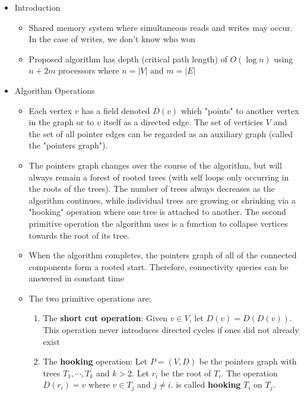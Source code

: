 \documentclass[a4paper]{article}
\begin{document}
\begin{itemize}
\item Introduction
\begin{itemize}
\item Shared memory system where simultaneous reads and writes may occur. In the case of writes, we don't know who won

\item Proposed algorithm has depth (critical path length) of $O(\log n)$ using $n + 2m$ processors where $n = |V|$ and $m = |E|$
\end{itemize}

\item Algorithm Operations
\begin{itemize}
\item Each vertex $v$ has a field denoted $D(v)$ which "points" to another vertex in the graph or to $v$ itself as a directed edge. The set of verticies $V$ and the set of all pointer edges can be regarded as an auxiliary graph (called the "pointers graph"). 

\item The pointers graph changes over the course of the algorithm, but will always remain a forest of rooted trees (with self loops only occurring in the roots of the trees). The number of trees always decreases as the algorithm continues, while individual trees are growing or shrinking via a "hooking" operation where one tree is attached to another. The second primitive operation the algorithm uses is a function to collapse vertices towards the root of its tree.

\item When the algorithm completes, the pointers graph of all of the connected components form a rooted start. Therefore, connectivity queries can be answered in constant time

\item The two primitive operations are:
\begin{enumerate}
\item The \textbf{short cut operation}: Given $v \in V$, let $D(v) = D(D(v))$. This operation never introduces directed cycles if ones did not already exist

\item The \textbf{hooking} operation: Let $P = (V, D)$ be the pointers graph with trees $T_1,\cdots,T_k$ and $k > 2$. Let $r_i$ be the root of $T_i$. The operation  $D(r_i) = v$ where $v \in T_j$ and $j \neq i$. is called \textbf{hooking} $T_i$ on $T_j$. 
\end{enumerate}


\end{itemize}
\end{itemize}
\end{document}
